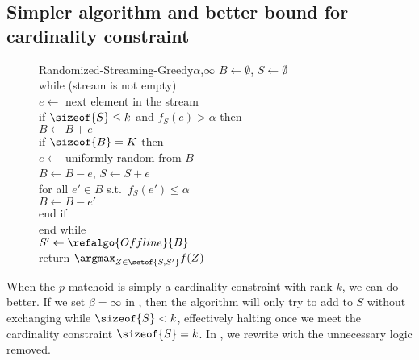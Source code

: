 \documentclass[oneside,letterpaper]{scrartcl} \usepackage{macros}
\begin{document}
\FloatBarrier
\subsection{Simpler algorithm and better bound for cardinality
  constraint}

\begin{figure}
\centering
  \begin{minipage}{7.15cm}
    \begin{framed}
      \begin{pseudocode}
        \begin{routine}
          {Randomized-Streaming-Greedy}{$\alpha$,$\infty$}
          $B \gets \emptyset$, $S \gets \emptyset$ \\
          while (stream is not empty) \\
          \> $e \gets$ next element in the stream \\
          \> if $\sizeof{S} \leq k$ and $f_S(e) > \alpha$ then \\
          \> \> $B \gets B + e$ \\
          \> if $\sizeof{B} = K$ then \\
          \> \> $e \gets$ uniformly random from $B$  \\
          \> \> $B \gets B - e$, $S \gets S + e$ \\
          \> \> for all $e' \in B$ s.t.\ $f_S(e') \leq \alpha$ \\
          \> \> \> $B \gets B - e'$\\
          \> end if \\
          end while \\
          $S' \gets \refalgo{Offline}{B}$\\
          return $\argmax_{Z \in \setof{S,S'}} f(Z)$
        \end{routine}
      \end{pseudocode}
    \end{framed}
    \vspace{.5em}
\caption{}


  \end{minipage}
\end{figure}

When the $p$-matchoid is simply a cardinality constraint with rank
$k$, we can do better. If we set $\beta = \infty$ in
, then the
algorithm will only try to add to $S$ without exchanging while
$\sizeof{S} < k$, effectively halting once we meet the cardinality
constraint $\sizeof{S} = k$. In
, we rewrite
 with the
unnecessary logic removed.
\end{document}
